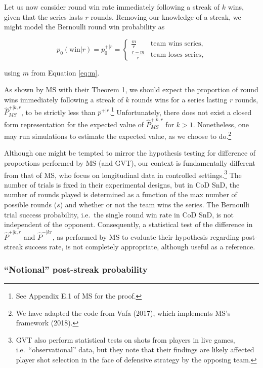 \documentclass{article}
\begin{document}
Let us now consider round win rate immediately following a streak of
\(k\) wins, given that the series lasts \(r\) rounds. Removing our
knowledge of a streak, we might model the Bernoulli round win
probability as

\begin{equation}\label{eq:pwr}
p_0(\text{win} | r) = p^{+|r}_0 = \begin{cases} 
\frac{m}{r} & \text{team wins series}, \\ 
\frac{r - m}{r} & \text{team loses series},
\end{cases}
\end{equation}

using \(m\) from Equation \ref{eq:m}.

As shown by MS with their Theorem 1, we should expect the proportion of
round wins immediately following a streak of \(k\) rounds wins for a
series lasting \(r\) rounds, \(\hat{P}^{+|k,r}_{MS}\), to be strictly
less than \(p^{+|r}\).\footnote{See Appendix E.1 of MS for the proof.}
Unfortunately, there does not exist a closed form representation for the
expected value of \(\hat{P}^{+|k,r}_{MS}\) for \(k > 1\). Nonetheless,
one may run simulations to estimate the expected value, as we choose to
do.\footnote{We have adapted the code from Vafa (2017), which implements
  MS's framework (2018).}

Although one might be tempted to mirror the hypothesis testing for
difference of proportions performed by MS (and GVT), our context is
fundamentally different from that of MS, who focus on longitudinal data
in controlled settings.\footnote{GVT also perform statistical tests on
  shots from players in live games, i.e.~``observational'' data, but
  they note that their findings are likely affected player shot
  selection in the face of defensive strategy by the opposing team.} The
number of trials is fixed in their experimental designs, but in CoD SnD,
the number of rounds played is determined as a function of the max
number of possible rounds (\(s\)) and whether or not the team wins the
series. The Bernoulli trial success probability, i.e.~the single round
win rate in CoD SnD, is not independent of the opponent. Consequently, a
statistical test of the difference in \(\hat{P}^{+|k,r}\) and
\(\hat{P}^{-|kr}\), as performed by MS to evaluate their hypothesis
regarding post-streak success rate, is not completely appropriate,
although useful as a reference.

\hypertarget{notional-post-streak-probability}{%
\subsubsection{``Notional'' post-streak
probability}\label{notional-post-streak-probability}}
\end{document}
